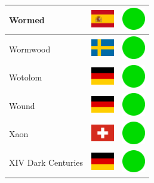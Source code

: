 \documentclass[12pt, a4paper, twoside]{report}
\begin{document}
\begin{center}
\begin{longtable}{|p{5cm}|p{2cm}|p{2cm}|}
 Wormed                                                     & \includegraphics[width=1cm]{../img/flags/es} &   \includegraphics[width=1cm]{../likes/y} \\ \hline
 Wormwood                                                   & \includegraphics[width=1cm]{../img/flags/se} &   \includegraphics[width=1cm]{../likes/y} \\ \hline
 Wotolom                                                    & \includegraphics[width=1cm]{../img/flags/de} &   \includegraphics[width=1cm]{../likes/y} \\ \hline
 Wound                                                      & \includegraphics[width=1cm]{../img/flags/de} &   \includegraphics[width=1cm]{../likes/y} \\ \hline
 Xaon                                                       & \includegraphics[width=1cm]{../img/flags/ch} &   \includegraphics[width=1cm]{../likes/y} \\ \hline
 XIV Dark Centuries                                         & \includegraphics[width=1cm]{../img/flags/de} &   \includegraphics[width=1cm]{../likes/y} \\ \hline

\end{longtable}
\end{center}
\end{document}
